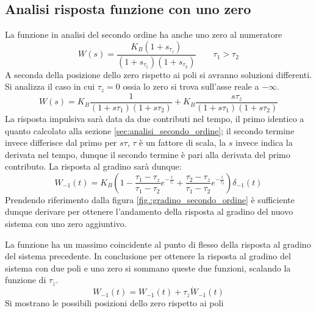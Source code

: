 \newpage
\subsection{Analisi risposta funzione con uno zero}
La funzione in analisi del secondo ordine ha anche uno zero al numeratore
$$
W(s) =
\frac{K_B\left(1+s_{\tau_z}\right)}{\left(1+s_{\tau_1}\right)
\left(1+s_{\tau_2}\right)} \qquad \tau_1>\tau_2
$$
A seconda della posizione dello zero rispetto ai poli si avranno soluzioni
differenti.
Si analizza il caso in cui $\tau_z = 0$ ossia lo zero si trova sull'asse reale
a $-\infty$.
$$
W(s) = K_B \frac{1}{(1+s\tau_1)(1+s\tau_2)} + K_B
\frac{s\tau_z}{(1+s\tau_1)(1+s\tau_2)}
$$
La risposta impulsiva sarà data da due contributi nel tempo, il primo identico
a quanto calcolato alla sezione \ref{sec:analisi_secondo_ordine}; il secondo
termine invece differisce dal primo per $s\tau$, $\tau$ è un fattore di scala,
la $s$ invece indica la derivata nel tempo, dunque il secondo termine è
pari alla derivata del primo contributo.
La risposta al gradino sarà dunque:
$$
W_{-1}(t) = K_B \left(1 -
\frac{\tau_1-\tau_z}{\tau_1-\tau_2}e^{-\frac{t}{\tau_1}} +
\frac{\tau_2-\tau_z}{\tau_1-\tau_2}e^{-\frac{t}{\tau_2}}
\right)\delta_{-1}(t)
$$
Prendendo riferimento dalla figura \ref{fig.:gradino_secondo_ordine} è
sufficiente dunque derivare per ottenere l'andamento della risposta al gradino
del nuovo sistema con uno zero aggiuntivo.
\begin{figure}[h]
 \centering
\end{figure}
La funzione ha un massimo coincidente al punto di flesso della risposta al
gradino del sistema precedente. In conclusione per ottenere la risposta al
gradino del sistema con due poli e uno zero si sommano queste due funzioni,
scalando la funzione di $\tau_z$. \def\tZeta{0.2}
$$
W_{-1}(t) = W_{-1}(t) + \tau_z\dot{W}_{-1}(t)
$$
Si mostrano le possibili posizioni dello zero rispetto ai poli


